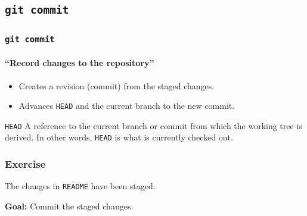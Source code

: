 \documentclass{beamer}
\newcommand\gitcmd[1]{\texttt{git #1}}
\newcommand\gHEAD{\texttt{HEAD}}
\newcommand\goal[1]{\textbf{Goal:} #1}
\begin{document}
\subsection{\gitcmd{commit}}

\begin{frame}
  \frametitle{\gitcmd{commit}}
  \framesubtitle{``Record changes to the repository''}
  \begin{itemize}
    \item Creates a revision (commit) from the staged changes.
    \item Advances \gHEAD{} and the current branch to the new commit.
  \end{itemize}
  \vfill
  \begin{block}{\gHEAD{}}
    A reference to the current branch or commit from which the working tree is derived. In other words, \gHEAD{} is what is currently checked out.
  \end{block}
\end{frame}

\begin{frame}
  \frametitle{Exercise}
  The changes in \texttt{README} have been staged.

  \goal{Commit the staged changes.}

  \begin{figure}
    \centering
  \end{figure}
\end{frame}
\end{document}
